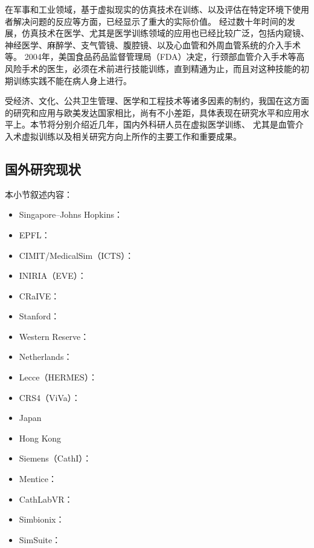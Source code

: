 
在军事和工业领域，基于虚拟现实的仿真技术在训练、以及评估在特定环境下使用者解决问题的反应等方面，已经显示了重大的实际价值\cite{Goodwin1978Simulator}\cite{Rolfe1986Simulators}\cite{Ressler1999Simulators}\cite{Wachtel1985Simulators}\cite{Liu2013Military}。
经过数十年时间的发展\cite{Dawson1998}，仿真技术在医学、尤其是医学训练领域的应用也已经比较广泛，包括内窥镜\cite{Vining1995Endoscopy}\cite{Preminger1996Endoscopy}、神经医学\cite{Kockro2000Neurosurgery}\cite{Cotin2005EVE}\cite{Ma2007NeuroCath}、麻醉学\cite{Gaba1988Anesthesiology}、支气管镜\cite{Vining1996Bronchoscopy}、腹腔镜\cite{Hon1994Laparoscopy}\cite{Derossis1998Laparoscopy}、以及心血管和外周血管系统的介入手术\cite{Chui1998ICard}\cite{Cotin2000ICTS}\cite{Tan2012NUDT}等。
2004年，美国食品药品监督管理局（FDA）决定，行颈部血管介入手术等高风险手术的医生，必须在术前进行技能训练，直到精通为止，而且对这种技能的初期训练实践不能在病人身上进行\cite{Dawson2006Medicine}。

受经济、文化、公共卫生管理、医学和工程技术等诸多因素的制约，我国在这方面的研究和应用与欧美发达国家相比，尚有不小差距，具体表现在研究水平和应用水平上。本节将分别介绍近几年，国内外科研人员在虚拟医学训练、
尤其是血管介入术虚拟训练以及相关研究方向上所作的主要工作和重要成果。

\subsection{国外研究现状}
\label{sec1-3-1}

本小节叙述内容：
\begin{itemize}
  \item Singapore--Johns Hopkins：
  \item EPFL：
  \item CIMIT/MedicalSim（ICTS）：
  \item INIRIA（EVE）：
  \item CRaIVE：
  \item Stanford：
  \item Western Reserve：
  \item Netherlands：
  \item Lecce（HERMES）：
  \item CRS4（ViVa）：\cite{abdoulaev1998}\cite{Zorcolo2000}\cite{Gobbetti1998}\cite{Gobbetti2000}\cite{Zorcolo1999}
  \item Japan
  \item Hong Kong
  \item Siemens（CathI）：
  \item Mentice：
  \item CathLabVR：\cite{caeweb}
  \item Simbionix：\cite{simbionixweb}
  \item SimSuite：\cite{simsuiteweb}
\end{itemize}


